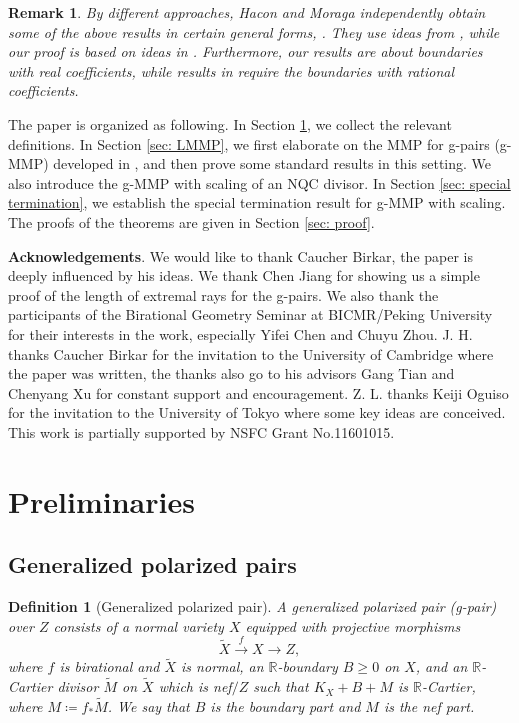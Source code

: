 \documentclass[11pt]{amsart}
\newcommand{\Rr}{\mathbb{R}}
\newtheorem{definition}[theorem]{Definition}
\newtheorem{remark}[theorem]{Remark}
\begin{document}
\begin{remark}
By different approaches, Hacon and Moraga independently obtain some of the above results in certain general forms, \cite{HM18weak}. They use ideas from \cite{Bir07}, while our proof is based on ideas in \cite{Birkar11,Birkar12,Birkarhuweak14}. Furthermore, our results are about boundaries with real coefficients, while results in \cite{HM18weak} require the boundaries with rational coefficients.\end{remark}

The paper is organized as following. In Section \ref{sec: preliminaries}, we collect the relevant definitions. In Section \ref{sec: LMMP}, we first elaborate on the MMP for g-pairs (g-MMP) developed in \cite{BZ16}, and then prove some standard results in this setting. We also introduce the g-MMP with scaling of an NQC divisor. In Section \ref{sec: special termination}, we establish the special termination result for g-MMP with scaling. The proofs of the theorems are given in Section \ref{sec: proof}. 


\medskip

\noindent\textbf{Acknowledgements}.
We would like to thank Caucher Birkar, the paper is deeply influenced by his ideas. We thank Chen Jiang for showing us a simple proof of the length of extremal rays for the g-pairs. We also thank the participants of the Birational Geometry Seminar at BICMR/Peking University for their interests in the work, especially Yifei Chen and Chuyu Zhou. J. H. thanks Caucher Birkar for the invitation to the University of Cambridge where the paper was written, the thanks also go to his advisors Gang Tian and Chenyang Xu for constant support and encouragement. Z. L. thanks Keiji Oguiso for the invitation to the University of Tokyo where some key ideas are conceived. This work is partially supported by NSFC Grant No.11601015.


\section{Preliminaries}\label{sec: preliminaries}
\subsection{Generalized polarized pairs}

\begin{definition}[Generalized polarized pair]\label{def: g-pair}
	A \emph{generalized polarized pair (g-pair)} over $Z$ consists of a normal variety $X$ equipped with projective morphisms 
	\[
	\tilde X \xrightarrow{f}X \to Z,
	\] where $f$ is birational and $\tilde X$ is normal, an $\Rr$-boundary $B \geq 0$ on $X$, and an $\Rr$-Cartier divisor $\tilde M$ on $\tilde X$ which is nef$/Z$ such that $K_{X}+B+M$ is $\Rr$-Cartier, where $M\coloneqq f_*\tilde M$. We say that $B$ is the boundary part and $M$ is the nef part. 
\end{definition}
	
\end{document}
